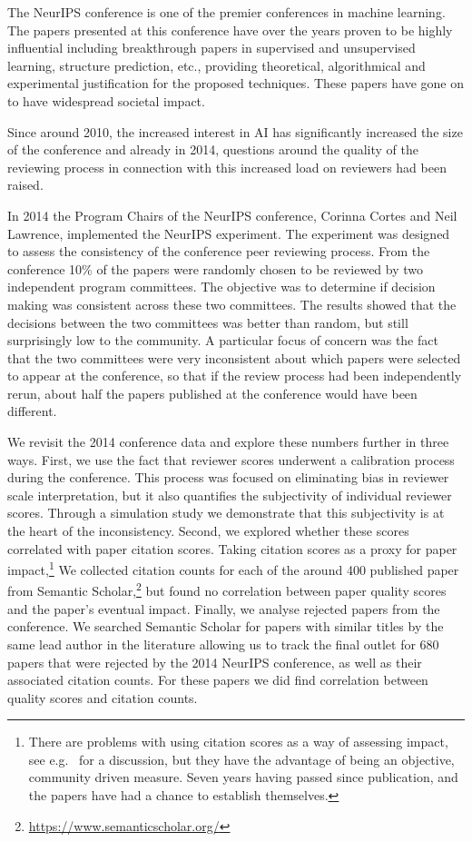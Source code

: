 \documentclass[twoside]{article}
\newcommand{\ignore}[1]{}
\begin{document}
The NeurIPS conference is one of the premier conferences in machine
learning.  The papers presented at this conference have over the years
proven to be highly influential including breakthrough papers in
supervised and unsupervised learning, structure prediction, etc.,
providing theoretical, algorithmical and experimental justification
for the proposed techniques.\ignore{unsupervised learning with neural
networks as well as papers on sequence-to-sequence learning for
machine translation.} These papers have gone on to have widespread
societal impact.

Since around 2010, the increased interest in AI has
significantly increased the size of the conference and already in
2014, questions around the quality of the reviewing process in
connection with this increased load on reviewers had been raised.

In 2014 the Program Chairs of the NeurIPS conference, Corinna Cortes
and Neil Lawrence, implemented the NeurIPS experiment. The experiment
was designed to assess the consistency of the conference peer
reviewing process. From the conference 10\% of the papers were
randomly chosen to be reviewed by two independent program
committees. The objective was to determine if decision making was
consistent across these two committees.  The results showed that the
decisions between the two committees was better than random, but still
surprisingly low to the community.  A particular focus of concern was
the fact that the two committees were 
very inconsistent about which papers were selected to appear at the
conference, so that if the review process had been independently
rerun, about half the papers published at the conference would have
been different.

We revisit the 2014 conference data and explore these numbers further
in three ways. First, we use the fact that reviewer scores underwent a
calibration process during the conference. This process was focused on
eliminating bias in reviewer scale interpretation, but it also
quantifies the subjectivity of individual reviewer scores. Through a
simulation study we demonstrate that this subjectivity is at the
heart of the inconsistency. Second, we explored whether these scores
correlated with paper citation scores.  Taking citation scores as a
proxy for paper impact,\footnote{There are problems with using
  citation scores as a way of assessing impact, see
  e.g.\ \cite{Neylon-article09} for a discussion, but they have the
  advantage of being an objective, community driven measure. Seven
  years having passed since publication, and the papers have had a
  chance to establish themselves.} We collected citation counts for
each of the around 400 published paper from Semantic
Scholar,\footnote{\url{https://www.semanticscholar.org/}} but found no
correlation between paper quality scores and the paper's eventual
impact. Finally, we analyse rejected papers from the conference. We
searched Semantic Scholar for papers with similar titles by the same
lead author in the literature allowing us to track the final outlet
for 680 papers that were rejected by the 2014 NeurIPS conference, as
well as their associated citation counts. For these papers we did find
correlation between quality scores and citation counts.
\end{document}
